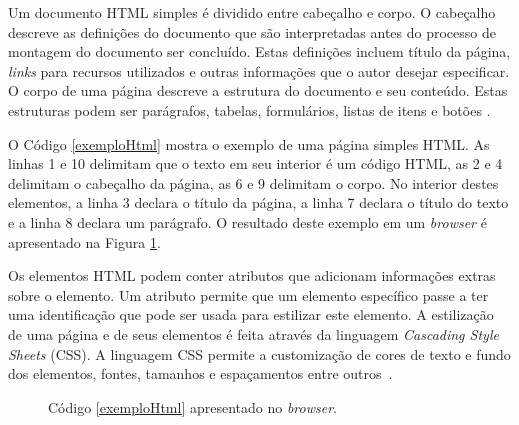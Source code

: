 Um documento HTML simples é dividido entre cabeçalho e corpo. O cabeçalho descreve as definições do documento que são interpretadas antes do processo de montagem do documento ser concluído. Estas definições incluem título da página, \emph{links} para recursos utilizados e outras informações que o autor desejar especificar. O corpo de uma página descreve a estrutura do documento e seu conteúdo. Estas estruturas podem ser parágrafos, tabelas, formulários, listas de itens e botões \cite{fundamentalsofmultimedia}.

O Código \ref{exemploHtml} mostra o exemplo de uma página simples HTML. As linhas 1 e 10 delimitam que o texto em seu interior é um código HTML, as 2 e 4 delimitam o cabeçalho da página, as 6 e 9 delimitam o corpo. No interior destes elementos, a linha 3 declara o título da página, a linha 7 declara o título do texto e a linha 8 declara um parágrafo. O resultado deste exemplo em um \emph{browser} é apresentado na Figura \ref{htmlExemploImagem}.




Os elementos HTML podem conter atributos que adicionam informações extras sobre o elemento. Um atributo permite que um elemento específico passe a ter uma identificação que pode ser usada para estilizar este elemento. A estilização de uma página e de seus elementos é feita através da linguagem \emph{Cascading Style Sheets} (CSS). A linguagem CSS permite a customização de cores de texto e fundo dos elementos, fontes, tamanhos e espaçamentos entre \mbox{outros \cite{mdn}}.

\begin{figure}[htb]
\begin{center}
  \centering
  \caption{Código \ref{exemploHtml} apresentado no \emph{browser}.}
    
    \label{htmlExemploImagem}
  
\end{center}

\end{figure}


